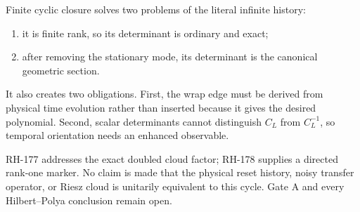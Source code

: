 \documentclass[12pt]{article}
\theoremstyle{remark}
\begin{document}
Finite cyclic closure solves two problems of the literal infinite history:
\begin{enumerate}[leftmargin=2em]
\item it is finite rank, so its determinant is ordinary and exact;
\item after removing the stationary mode, its determinant is the canonical
geometric section.
\end{enumerate}
It also creates two obligations.  First, the wrap edge must be derived from
physical time evolution rather than inserted because it gives the desired
polynomial.  Second, scalar determinants cannot distinguish $C_L$ from
$C_L^{-1}$, so temporal orientation needs an enhanced observable.

RH-177 addresses the exact doubled cloud factor; RH-178 supplies a directed
rank-one marker.  No claim is made that the physical reset history, noisy
transfer operator, or Riesz cloud is unitarily equivalent to this cycle.
Gate A and every Hilbert--Polya conclusion remain open.



\end{document}
